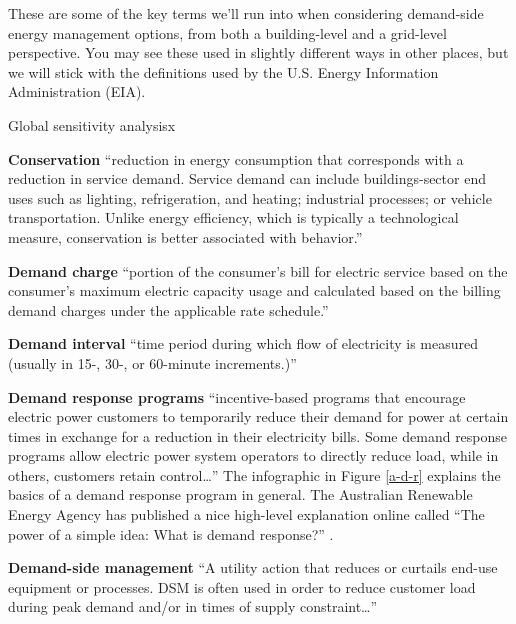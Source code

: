 \documentclass[10pt]{article}
\begin{document}
These are some of the key terms we'll run into when considering demand-side energy management options, from both a building-level and a grid-level perspective. You may see these used in slightly different ways in other places, but we will stick with the definitions used by the U.S. Energy Information Administration (EIA).

\begin{labeling}{Global sensitivity analysisx}

\item [\textbf{Conservation}] ``reduction in energy consumption that corresponds with a reduction in service demand. Service demand can include buildings-sector end uses such as lighting, refrigeration, and heating; industrial processes; or vehicle transportation. Unlike energy efficiency, which is typically a technological measure, conservation is better associated with behavior.''  \cite{EIAglossary}

\item [\textbf{Demand charge}]  ``portion of the consumer's bill for electric service based on the consumer's maximum electric capacity usage and calculated based on the billing demand charges under the applicable rate schedule.''  \cite{EIAglossary}

\item [\textbf{Demand interval}]  ``time period during which flow of electricity is measured (usually in 15-, 30-, or 60-minute increments.)''  \cite{EIAglossary}


\item [\textbf{Demand response programs}] ``incentive-based programs that encourage electric power customers to temporarily reduce their demand for power at certain times in exchange for a reduction in their electricity bills. Some demand response programs allow electric power system operators to directly reduce load, while in others, customers retain control\ldots'' \cite{EIAglossary} The infographic in Figure \ref{a-d-r} explains the basics of a demand response program in general. The Australian Renewable Energy Agency has published a nice high-level explanation online called ``The power of a simple idea: What is demand response?'' \cite{Arena_undated-cl}.

\item [\textbf{Demand-side management}] ``A utility action that reduces or curtails end-use equipment or processes. DSM is often used in order to reduce customer load during peak demand and/or in times of supply constraint\ldots''


\end{labeling}
\end{document}

